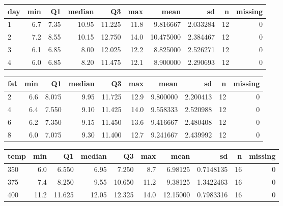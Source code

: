 \documentclass[12pt,]{article}
\begin{document}
\begin{table}[H]
\centering\begingroup\fontsize{8}{10}\selectfont

\begin{tabular}{lrrrrr>{\columncolor[HTML]{EAFAF1}}rrrr}
\toprule
day & min & Q1 & median & Q3 & max & mean & sd & n & missing\\
\midrule
1 & 6.7 & 7.35 & 10.95 & 11.225 & 11.8 & 9.816667 & 2.033284 & 12 & 0\\
2 & 7.2 & 8.55 & 10.15 & 12.750 & 14.0 & 10.475000 & 2.384467 & 12 & 0\\
3 & 6.1 & 6.85 & 8.00 & 12.025 & 12.2 & 8.825000 & 2.526271 & 12 & 0\\
4 & 6.0 & 6.85 & 8.20 & 11.475 & 12.1 & 8.900000 & 2.290693 & 12 & 0\\
\bottomrule
\end{tabular}
\endgroup{}
\end{table}

\begin{table}[H]
\centering\begingroup\fontsize{8}{10}\selectfont

\begin{tabular}{lrrrrr>{\columncolor[HTML]{EAFAF1}}rrrr}
\toprule
fat & min & Q1 & median & Q3 & max & mean & sd & n & missing\\
\midrule
2 & 6.6 & 8.075 & 9.95 & 11.725 & 12.9 & 9.800000 & 2.200413 & 12 & 0\\
4 & 6.4 & 7.550 & 9.10 & 11.425 & 14.0 & 9.558333 & 2.520988 & 12 & 0\\
6 & 6.2 & 7.350 & 9.15 & 11.450 & 13.6 & 9.416667 & 2.480408 & 12 & 0\\
8 & 6.0 & 7.075 & 9.30 & 11.400 & 12.7 & 9.241667 & 2.439992 & 12 & 0\\
\bottomrule
\end{tabular}
\endgroup{}
\end{table}

\begin{table}[H]
\centering\begingroup\fontsize{8}{10}\selectfont

\begin{tabular}{lrrrrr>{\columncolor[HTML]{EAFAF1}}rrrr}
\toprule
temp & min & Q1 & median & Q3 & max & mean & sd & n & missing\\
\midrule
350 & 6.0 & 6.550 & 6.95 & 7.250 & 8.7 & 6.98125 & 0.7148135 & 16 & 0\\
375 & 7.4 & 8.250 & 9.55 & 10.650 & 11.2 & 9.38125 & 1.3422463 & 16 & 0\\
400 & 11.2 & 11.625 & 12.05 & 12.325 & 14.0 & 12.15000 & 0.7983316 & 16 & 0\\
\bottomrule
\end{tabular}
\endgroup{}
\end{table}
\end{document}
